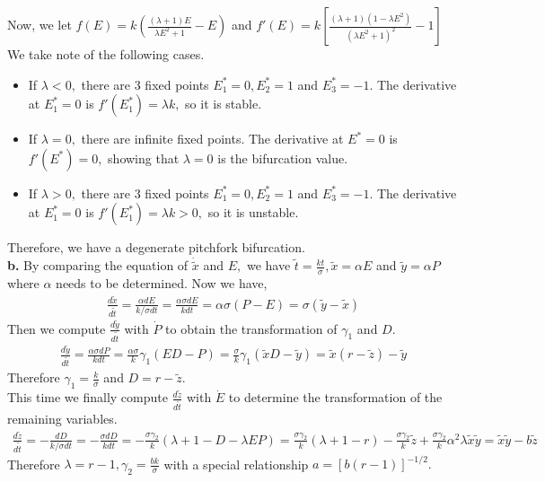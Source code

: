 \documentclass[12pt]{article}
\begin{document}
Now, we let $f(E)=k\left(\frac{(\lambda+1)E}{\lambda E^2+1}-E\right)$ and $f'(E)=k\left[\frac{(\lambda+1)\left(1-\lambda E^2\right)}{\left(\lambda E^2+1\right)^2}-1\right]$\\
We take note of the following cases.\\
\begin{itemize}
\item[1.] If $\lambda <0,$ there are 3 fixed points $E_1^*=0, E_2^*=1$ and $E_3^*=-1.$ The derivative at $E_1^*=0$ is $f'(E_1^*)=\lambda k,$ so it is stable.\\
\item[2.] If $\lambda=0,$ there are infinite fixed points. The derivative at $E^*=0$ is $f'(E^*)=0,$ showing that $\lambda=0$ is the bifurcation value.\\
\item[3.] If $\lambda >0,$ there are 3 fixed points $E_1^*=0, E_2^*=1$ and $E_3^*=-1.$ The derivative at $E_1^*=0$ is $f'(E_1^*)=\lambda k>0,$ so it is unstable.
\end{itemize}
Therefore, we have a degenerate pitchfork bifurcation.\\
\indent
{\bf b. } By comparing the equation of $\dot{\tilde{x}}$ and $E,$ we have $\tilde{t}=\frac{kt}{\sigma}, \tilde{x}=\alpha E$ and $\tilde{y}=\alpha P$ where $\alpha$ needs to be determined. Now we have,
\begin{align*}
\frac{d \tilde{x}}{d \tilde{t}}=\frac{\alpha dE}{k/ \sigma dt}=\frac{\alpha \sigma dE}{k dt }=\alpha \sigma (P-E)=\sigma(\tilde{y}-\tilde{x})
\end{align*}
 Then we compute $\frac{d \tilde{y}}{d \tilde{t}}$ with $\dot{P}$ to obtain the transformation of $\gamma_1$ and $D.$
\begin{align*}
\frac{d \tilde{y}}{d \tilde{t}}= \frac{\alpha  \sigma dP}{k dt}=\frac{\alpha \sigma}{k} \gamma_1(ED -P)=\frac{\sigma}{k} \gamma_1(\tilde{x} D-\tilde{y})=\tilde{x}(r-\tilde{z})-\tilde{y}
\end{align*}
Therefore $\gamma_1=\frac{k}{\sigma}$ and $D=r-\tilde{z}.$\\
This time we finally compute $\frac{d \tilde{z}}{d \tilde{t}}$ with $\dot{E}$ to determine the transformation of the remaining variables.\\
\begin{align*}
\frac{d \tilde{z}}{d \tilde{t}}= -\frac{dD}{k/ \sigma dt}=-\frac{\sigma dD}{k dt}=-\frac{\sigma \gamma_2}{k}\left(\lambda +1 -D-\lambda EP\right)=\frac{\sigma \gamma_2}{k}\left(\lambda+1-r \right)-\frac{\sigma \gamma_2}{k}\tilde{z}+\frac{\sigma \gamma_2}{k} \alpha^2 \lambda \tilde{x} \tilde{y}=\tilde{x} \tilde{y}-b \tilde{z}
\end{align*}
Therefore $\lambda=r-1, \gamma_2=\frac{bk}{\sigma}$ with a special relationship $a=[b(r-1)]^{-1/2}.$\\
\end{document}
